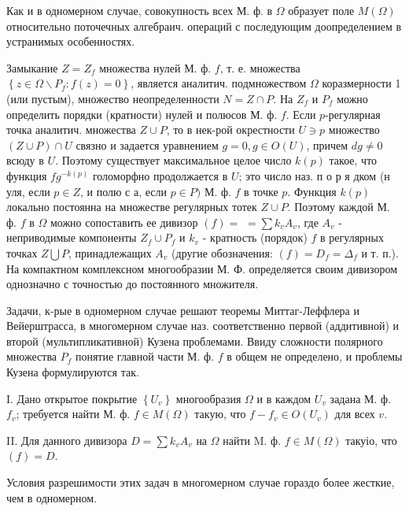 \documentclass[10pt]{article}
\begin{document}
Как и в одномерном случае, совокупность всех М. ф. в $\Omega$ образует поле $M(\Omega)$ относительно поточечных алгебраич. операций с последующим доопределением в устранимых особенностях.



Замыкание $Z=Z_{f}$ множества нулей М. ф. $f$, т. е. множества $\left\{z \in \Omega \backslash P_{f}: f(z)=0\right\}$, является аналитич. подмножеством $\Omega$ коразмерности 1 (или пустым), множество неопределенности $N=Z \cap P$. На $Z_{f}$ и $P_{f}$ можно определить порядки (кратности) нулей и полюсов М. ф. $f$. Если $p$-регулярная точка аналитич. множества $Z \cup P$, то в нек-рой окрестности $U \ni p$ множество $(Z \cup P) \cap U$ связно и задается уравнением $g=0, g \in O(U)$, причем $d g \neq 0$ всюду в $U$. Поэтому существует максимальное целое число $k(p)$ такое, что функция $f g^{-k(p)}$ голоморфно продолжается в $U$; это число наз. п о р я дком (н уля, если $p \in Z$, и полю с а, если $p \in P)$ М. ф. $f$ в точке $p$. Функция $k(p)$ локально постоянна на множестве регулярных тотек $Z \cup P$. Поэтому каждой М. ф. $f$ в $\Omega$ можно сопоставить ее дивизор $(f)=$ $=\sum k_{v} A_{v}$, где $A_{v}$ - неприводимые компоненты $Z_{f} \cup P_{f}$ и $k_{v}$ - кратность (порядок) $f$ в регулярных точках $Z \bigcup P$, принадлежащих $A_{v}$ (другие обозначения: $(f)=D_{f}=\Delta_{f}$ и т. п.). На компактном комплексном многообразии М. Ф. определяется своим дивизором однозначно с точностью до постоянного множителя.



Задачи, к-рые в одномерном случае решают теоремы Миттаг-Леффлера и Вейерштрасса, в многомерном случае наз. соответственно первой (аддитивной) и второй (мультипликативной) Кузена проблемами. Ввиду сложности полярного множества $P_{f}$ понятие главной части М. ф. $f$ в общем не определено, и проблемы Кузена формулируются так.



I. Дано открытое покрытие $\left\{U_{v}\right\}$ многообразия $\Omega$ и в каждом $U_{v}$ задана М. ф. $f_{v}$; требуется найти М. ф. $f \in M(\Omega)$ такую, что $f-f_{v} \in O\left(U_{v}\right)$ для всех $v$.



II. Для данного дивизора $D=\sum k_{v} A_{v}$ на $\Omega$ найти M. ф. $f \in M(\Omega)$ такуіо, что $(f)=D$.



Условия разрешимости этих задач в многомерном случае гораздо более жесткие, чем в одномерном.
\end{document}
